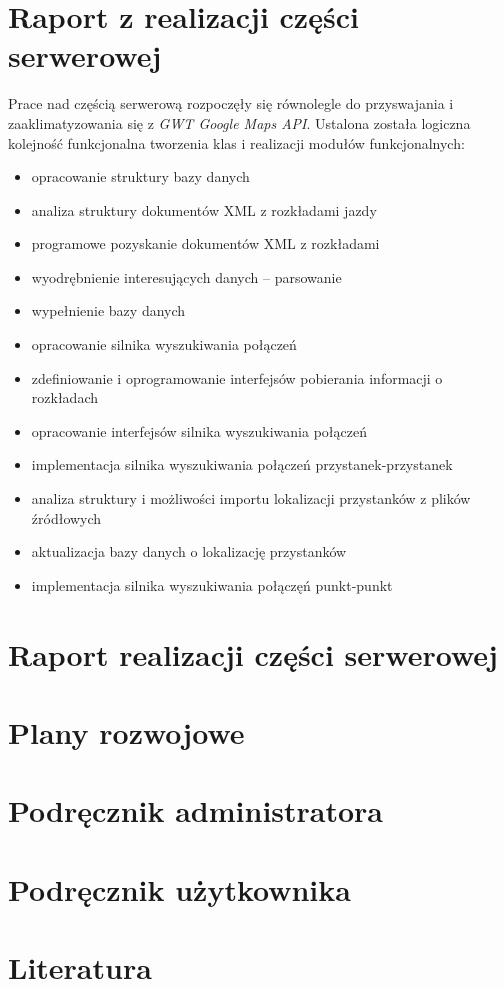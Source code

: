 \documentclass[a4paper,12pt]{article}
\begin{document}
\section{Raport z realizacji części serwerowej}
Prace nad częścią serwerową rozpoczęły się równolegle do przyswajania i
zaaklimatyzowania się z \emph{GWT Google Maps API}. Ustalona została logiczna
kolejność funkcjonalna tworzenia klas i realizacji modułów funkcjonalnych:
\begin{itemize}
  \item opracowanie struktury bazy danych
  \item analiza struktury dokumentów XML z rozkładami jazdy 
  \item programowe pozyskanie dokumentów XML z rozkładami
  \item wyodrębnienie interesujących danych -- parsowanie
  \item wypełnienie bazy danych
  \item opracowanie silnika wyszukiwania połączeń
  \item zdefiniowanie i oprogramowanie interfejsów pobierania informacji o
  rozkładach
  \item opracowanie interfejsów silnika wyszukiwania połączeń
  \item implementacja silnika wyszukiwania połączeń przystanek-przystanek
  \item analiza struktury i możliwości importu lokalizacji przystanków z plików
  źródłowych
  \item aktualizacja bazy danych o lokalizację przystanków
  \item implementacja silnika wyszukiwania połączęń punkt-punkt 
\end{itemize}
\section{Raport realizacji  części serwerowej} 
\section{Plany rozwojowe} 
\section{Podręcznik administratora}
\section{Podręcznik użytkownika}
\section{Literatura}
\end{document}
